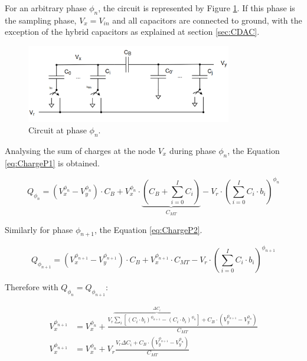 For an arbitrary phase $\phi_n$, the circuit is represented by Figure \ref{fig:P1_Circ}. If this phase is the sampling phase, $V_x = V_{in}$ and all capacitors are connected to ground, with the exception of the hybrid capacitors as explained at section \ref{sec:CDAC}.

\begin{figure}[H]

    \centering
    \includegraphics*[width=0.8\textwidth]{Images/DACCircPn.png}
    \caption{Circuit at phase $\phi_n$.}

    \label{fig:P1_Circ}
\end{figure}


Analysing the sum of charges at the node $V_x$ during phase $\phi_n$, the Equation \ref{eq:ChargeP1} is obtained.

\begin{equation}
    Q_{\phi_n} = (V_x^{\phi_n}-V_y^{\phi_n})\cdot C_B + V_x^{\phi_n}\cdot \underbrace{ \left ( C_B + \sum_{i=0}^{I}C_i \right )}_{C_{MT}}-V_r\cdot \left ( \sum_{i=0}^{I} C_i\cdot b_i \right )^{\phi_n}
    \label{eq:ChargeP1}
\end{equation}

Similarly for phase $\phi_{n+1}$, the Equation \ref{eq:ChargeP2}.

\begin{equation}
    Q_{\phi_{n+1}} = (V_x^{\phi_{n+1}}-V_y^{\phi_{n+1}})\cdot C_B + V_x^{\phi_{n+1}}\cdot C_{MT}-V_r\cdot \left ( \sum_{i=0}^{I} C_i\cdot b_i \right )^{\phi_{n+1}}
    \label{eq:ChargeP2}
\end{equation}

Therefore with $Q_{\phi_{n}}=Q_{\phi_{n+1}}$:

\begin{equation}
    \begin{split}
        V_x^{\phi_{n+1}} &= V_x^{\phi_{n}} +  \frac{ V_r\overbrace{\sum_{i}\left[ (C_i\cdot b_i)^{\phi_{n+1}} - (C_i\cdot b_i)^{\phi_{n}}\right]}^{\Delta C_i}+C_B\cdot \left(V_y^{\phi_{n+1}}-V_y^{\phi_{n}}\right)}{C_{MT}} \\
        V_x^{\phi_{n+1}} &= V_x^{\phi_{n}} + V_r \frac{ V_r \Delta C_i +C_B\cdot \left(V_y^{\phi_{n+1}}-V_y^{\phi_{n}}\right)}{C_{MT}}
    \end{split}
    \label{eq:VxPn}
\end{equation}

